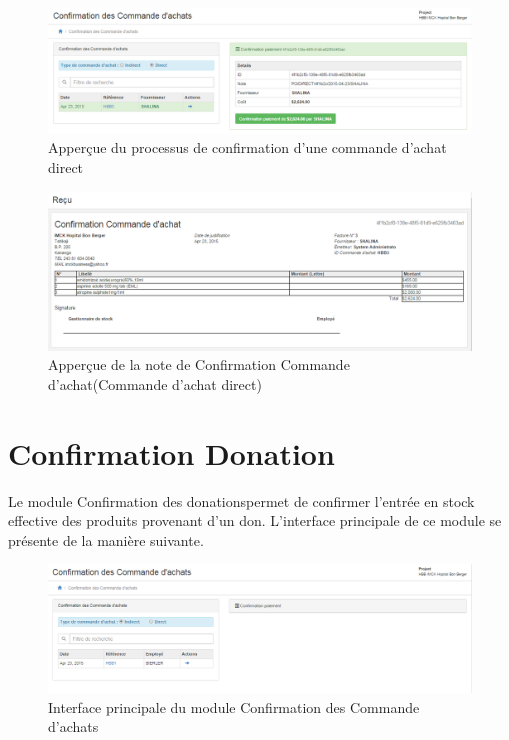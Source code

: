 \documentclass[12pt,a4paper]{report}
\begin{document}
\newpage

\begin{figure}[h]
\begin{center}
\includegraphics[width=12cm]{pic/ConfPOAchatDirect.png}
\end{center}
\caption{Apperçue du processus de confirmation d'une commande d'achat direct}
\label{Apperçue du processus de confirmation d'une commande d'achat direct}
\end{figure} 


\begin{figure}[h]
\begin{center}
\includegraphics[width=12cm]{pic/ConfComAchat.png}
\end{center}
\caption{Apperçue de la note de Confirmation Commande d'achat(Commande d'achat direct)}
\label{Apperçue de la note de Confirmation Commande d'achat(Commande d'achat direct)}
\end{figure} 

\newpage
\section{Confirmation Donation}
Le module Confirmation des donationspermet de confirmer l'entrée en stock effective des produits provenant d'un don. L'interface principale de ce module se présente de la manière suivante.

\begin{figure}[h]
\begin{center}
\includegraphics[width=12cm]{pic/ConfPaieAchat.png}
\end{center}
\caption{Interface principale du module Confirmation des Commande d'achats}
\label{Interface principale du module Confirmation des Commande d'achats}
\end{figure}  
\end{document}
